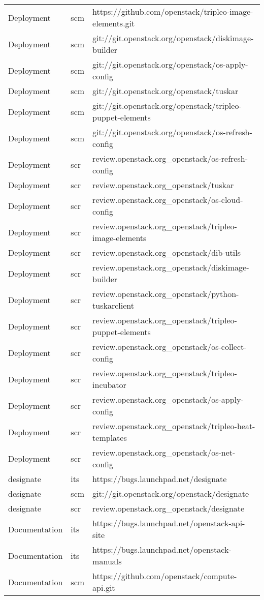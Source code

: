 \begin{center}
\begin{longtable}{|p{4cm}|p{1cm}|p{10cm}|}
Deployment&scm&https://github.com/openstack/tripleo-image-elements.git\\
Deployment&scm&git://git.openstack.org/openstack/diskimage-builder\\
Deployment&scm&git://git.openstack.org/openstack/os-apply-config\\
Deployment&scm&git://git.openstack.org/openstack/tuskar\\
Deployment&scm&git://git.openstack.org/openstack/tripleo-puppet-elements\\
Deployment&scm&git://git.openstack.org/openstack/os-refresh-config\\
Deployment&scr&review.openstack.org\_openstack/os-refresh-config\\
Deployment&scr&review.openstack.org\_openstack/tuskar\\
Deployment&scr&review.openstack.org\_openstack/os-cloud-config\\
Deployment&scr&review.openstack.org\_openstack/tripleo-image-elements\\
Deployment&scr&review.openstack.org\_openstack/dib-utils\\
Deployment&scr&review.openstack.org\_openstack/diskimage-builder\\
Deployment&scr&review.openstack.org\_openstack/python-tuskarclient\\
Deployment&scr&review.openstack.org\_openstack/tripleo-puppet-elements\\
Deployment&scr&review.openstack.org\_openstack/os-collect-config\\
Deployment&scr&review.openstack.org\_openstack/tripleo-incubator\\
Deployment&scr&review.openstack.org\_openstack/os-apply-config\\
Deployment&scr&review.openstack.org\_openstack/tripleo-heat-templates\\
Deployment&scr&review.openstack.org\_openstack/os-net-config\\
designate&its&https://bugs.launchpad.net/designate\\
designate&scm&git://git.openstack.org/openstack/designate\\
designate&scr&review.openstack.org\_openstack/designate\\
Documentation&its&https://bugs.launchpad.net/openstack-api-site\\
Documentation&its&https://bugs.launchpad.net/openstack-manuals\\
Documentation&scm&https://github.com/openstack/compute-api.git\\

\end{longtable}
\end{center}
